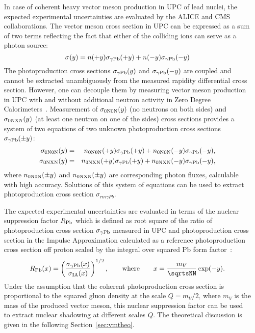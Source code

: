 \documentclass[../report.tex]{subfiles}
\begin{document}
In case of coherent heavy vector meson production in UPC of lead nuclei, the expected experimental uncertainties are evaluated by the ALICE and CMS collaborations.
The vector meson cross section in \PbPb UPC can be expressed as a sum of two terms reflecting the fact that either of the colliding ions can serve as a photon source:
\begin{equation}
\sigma(y) = n(+y) \sigma_{\rm \gamma Pb}(+y) + n(-y) \sigma_{\rm \gamma Pb}(-y)
\end{equation}
The photoproduction cross sections $\sigma_{\rm \gamma Pb}(y)$ and $\sigma_{\rm \gamma Pb}(-y)$ are coupled and cannot be extracted unambiguously from the measured rapidity differential cross section. However, one can decouple them by measuring vector meson production in UPC with and without additional neutron activity in Zero Degree Calorimeters~\cite{Guzey:2013jaa}. Measurement of $\sigma_{\rm 0N0N}(y)$ (no neutrons on both sides) and $\sigma_{\rm 0NXN}(y)$ (at least one neutron on one of the sides) cross sections provides a system of two equations of two unknown photoproduction cross sections $\sigma_{\rm \gamma Pb}(\pm y)$:
\begin{eqnarray}
\sigma_{\rm 0N0N}(y) &=& n_{\rm 0N0N}(+y) \sigma_{\rm \gamma Pb}(+y) + n_{\rm 0N0N}(-y) \sigma_{\rm \gamma Pb}(-y), \\
\sigma_{\rm 0NXN}(y) &=& n_{\rm 0NXN}(+y) \sigma_{\rm \gamma Pb}(+y) + n_{\rm 0NXN}(-y) \sigma_{\rm \gamma Pb}(-y),
\end{eqnarray}
where $n_{\rm 0N0N}(\pm y)$ and $n_{\rm 0NXN}(\pm y)$ are corresponding photon fluxes, calculable with high accuracy.
Solutions of this system of equations can be used to extract photoproduction cross section $\sigma_{rm \gamma Pb}$.

The expected experimental uncertainties are evaluated in terms of the nuclear suppression factor $R_{\rm Pb}$ which is defined as root square of the ratio of photoproduction cross section $\sigma_{\rm \gamma Pb}$ measured in \PbPb UPC and photoproduction cross section in the Impulse Approximation calculated as a reference photoproduction cross section off proton scaled by the integral over squared Pb form factor~\cite{Guzey:2013xba}:
\begin{equation}
R_{\rm Pb} (x) = \left(\frac{\sigma_{\rm \gamma Pb}(x)}{\sigma_{\rm IA}(x)}\right)^{1/2}, \qquad {\rm where}\qquad x  = \frac{m_{V}}{\sqrtsNN}\exp(-y).
\end{equation}
Under the assumption that the coherent photoproduction cross section is proportional to the squared gluon density at the scale $Q = m_{V}/2$, where $m_V$ is the mass of the produced vector meson, this nuclear suppression factor can be used to extract nuclear shadowing at different scales $Q$. The theoretical discussion is given in the following Section~\ref{sec:vmtheo}.
\end{document}
